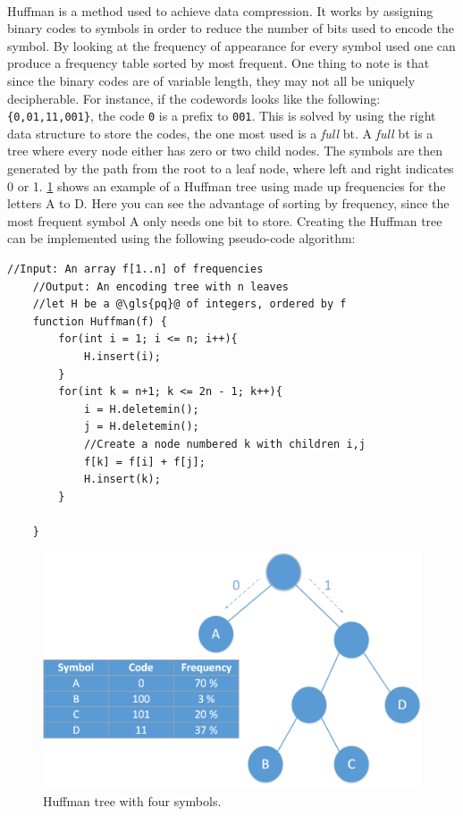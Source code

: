 \documentclass[a4paper, 12pt]{report}\dfrac{\right }{•}
\newcommand{\codeword}[1]{\texttt{#1}}
\begin{document}
\paragraph{}
Huffman is a method used to achieve data compression\cite{huffman}.
It works by assigning binary codes to symbols in order to reduce the number of bits used to encode the symbol.
By looking at the frequency of appearance for every symbol used one can produce a frequency table sorted by most frequent.
One thing to note is that since the binary codes are of variable length, they may not all be uniquely decipherable.
For instance, if the codewords looks like the following: \codeword{\{0,01,11,001\}}, the code \codeword{0} is a prefix to \codeword{001}.
This is solved by using the right data structure to store the codes, the one most used is a \textit{full} \gls{bt}.
A \textit{full} \gls{bt} is a tree where every node either has zero or two child nodes.
The symbols are then generated by the path from the root to a leaf node, where left and right indicates 0 or 1.
\ref{fig:hm-ex} shows an example of a Huffman tree using made up frequencies for the letters A to D.
Here you can see the advantage of sorting by frequency, since the most frequent symbol A only needs one bit to store.
Creating the Huffman tree can be implemented using the following pseudo-code algorithm:

\begin{lstlisting}[caption=Huffman algorithm \cite{algorithms}, label=lst:huffman]
	//Input: An array f[1..n] of frequencies
	//Output: An encoding tree with n leaves
	//let H be a @\gls{pq}@ of integers, ordered by f
	function Huffman(f) {
		for(int i = 1; i <= n; i++){
			H.insert(i);
		}
		for(int k = n+1; k <= 2n - 1; k++){
			i = H.deletemin();
			j = H.deletemin();
			//Create a node numbered k with children i,j
			f[k] = f[i] + f[j];
			H.insert(k);
		}

	}
\end{lstlisting}

\begin{figure}[h!]
	\centering
		\includegraphics[width=1.0\textwidth]{images/huffman.png}
		\caption{Huffman tree with four symbols.}
		\label{fig:hm-ex}
\end{figure}
\end{document}
